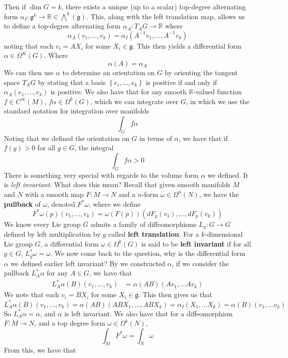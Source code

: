 \documentclass[psamsfonts]{amsart}
\theoremstyle{definition}
\theoremstyle{remark}
\newcommand{\R}{\mathbb{R}}
\newcommand{\g}{\mathfrak{g}}
\newcommand{\inv}{^{-1}}
\newcommand{\set}[1]{\left\lbrace#1 \right\rbrace}
\begin{document}
Then if $\dim G = k$, there exists a unique (up to a scalar) top-degree alternating form $\alpha_I: \g^k \to \R \in \bigwedge^k(\g)$. This, along with the left translation map, allows us to define a top-degree alternating form $\alpha_A: T_AG \to \R$ where
$$\alpha_A(v_1, \ldots, v_k) = \alpha_I(A\inv v_1, \ldots, A\inv v_k) $$
noting that each $v_i = AX_i$ for some $X_i \in \g$. This then yields a differential form $\alpha \in \Omega^K(G)$. Where 
$$\alpha(A) = \alpha_A $$
We can then use $\alpha$ to determine an orientation on $G$ by orienting the tangent space $T_AG$ by stating that a basis $\set{e_i, \ldots, e_k}$ is positive if and only if $\alpha_A(e_1, \ldots, e_k)$ is positive. We also have that for any smooth $\R$-valued function $f \in C^\infty(M)$, $f\alpha \in \Omega^k(G)$, which we can integrate over $G$, in which we use the standard notation for integration over manifolds
$$\int_G f\alpha $$
Noting that we defined the orientation on $G$ in terms of $\alpha$, we have that if $f(g) > 0$ for all $g \in G$, the integral
$$\int_G f\alpha > 0 $$
There is something very special with regards to the volume form $\alpha$ we defined. It is \emph{left invariant}. What does this mean? Recall that given smooth manifolds $M$ and $N$ with a smooth map $F:M\to N$ and a $n$-form $\omega \in \Omega^n(N)$, we have the \textbf{pullback} of $\omega$, denoted $F^*\omega$, where we define
$$F^*\omega(p)(v_1, \ldots, v_k) = \omega(F(p))(dF_p(v_1), \ldots, dF_p(v_k))$$
We know every Lie group $G$ admits a family of diffeomorphisms $L_g: G \to G$ defined by left multiplication by $g$ called \textbf{left translation}. For a $k$-dimensional Lie group $G$, a differential form $\omega \in \Omega^k(G)$ is said to be \textbf{left invariant} if for all $g\in G$, $L^*_g\omega = \omega$. We now come back to the question, why is the differential form $\alpha$ we defined earlier left invariant? By we constructed $\alpha$, if we consider the pullback $L_A^*\alpha$ for any $A \in G$, we have that 
\begin{align*}
L_A^*\alpha(B)(v_1, \ldots, v_k) &= \alpha(AB)(Av_1, \ldots Av_k)
\end{align*}
We note that each $v_i = BX_i$ for some $X_i \in \g$. This then gives us that 
$$L_A^*\alpha(B)(v_1, \ldots, v_k) = \alpha(AB)(ABX_1, \ldots, ABX_k) = \alpha_I(X_1,\ldots X_k) = \alpha(B)(v_1, \ldots v_k) $$
So $L^*_A\alpha = \alpha$, and $\alpha$ is left invariant. We also have that for a diffeomorphism $F: M \to N$, and a top degree form $\omega \in \Omega^k(N)$,
$$\int_M F^*\omega = \int_N \omega $$
From this, we have that 
\end{document}
